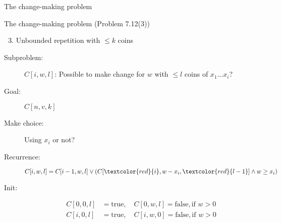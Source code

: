 \begin{frame}{The change-making problem}
  \begin{exampleblock}{The change-making problem (Problem 7.12(3))}
	\begin{enumerate}[(1)]
	  \setcounter{enumi}{2}
	  \item Unbounded repetition with $\le k$ coins
	\end{enumerate}
  \end{exampleblock}

  \pause
  \begin{description}
	\item[Subproblem:] $C[i,w,l]$: Possible to make change for $w$ with $\le l$ coins of $x_{1} \dots x_{i}$?
	\item[Goal:] $C[n,v,k]$
	  \pause
	\item[Make choice:] Using $x_{i}$ or not? 
	\item[Recurrence:] 
	  \[
		C[i,w,l] = C[i-1,w,l] \lor \left( C[\textcolor{red}{i}, w-x_{i}, \textcolor{red}{l-1}] \land w \ge x_{i} \right)
	  \]
	  \pause
	\item[Init:]
	  \begin{align*}
		C[0,0,l] &= \text{true}, \quad C[0,w,l] = \text{false}, \text{if } w > 0 \\
		C[i,0,l] &= \text{true}, \quad C[i,w,0] = \text{false}, \text{if } w > 0
	  \end{align*}
  \end{description}
\end{frame}
